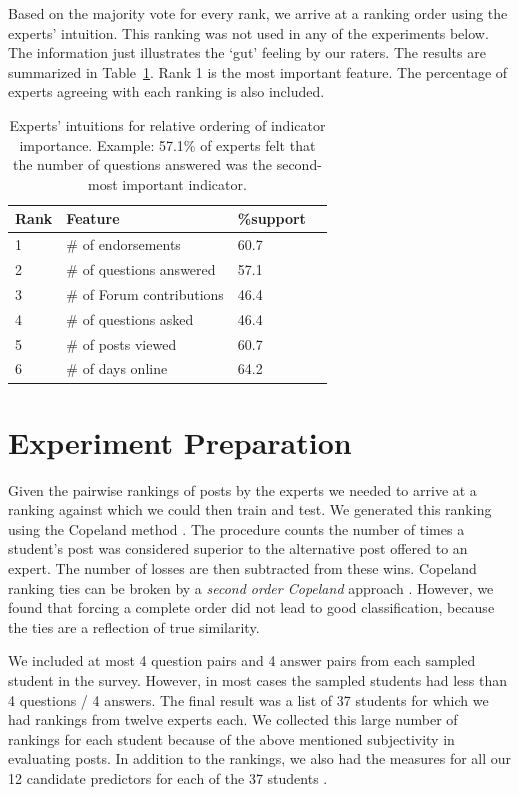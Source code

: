 Based on the majority vote for every rank, we arrive at a ranking
order using the experts' intuition. This ranking was not used in any
of the experiments below. The information just illustrates the `gut'
feeling by our raters. The results are summarized in
Table~\ref{tab:faqRes}. Rank 1 is the most important feature. The
percentage of experts agreeing with each ranking is also included.

\begin{table}
\centering
\caption{Experts' intuitions for relative ordering of indicator
  importance. Example: 57.1\% of experts felt that the number of
  questions answered was the second-most important indicator.}
\label{tab:faqRes}
\begin{tabular}{lllc}
\hline
\centering \textbf{Rank} & \textbf{Feature} & \textbf{ \%support}  & \\ \hline
1 & \# of endorsements & 60.7   \\
2 & \# of questions answered & 57.1\\
3 & \# of Forum contributions & 46.4\\
4 & \# of questions asked & 46.4 \\
5 & \# of posts viewed & 60.7 \\
6 & \# of days online & 64.2    \\ \hline
\end{tabular}
\end{table}


\section{Experiment Preparation}
Given the pairwise rankings of posts by the experts we needed to
arrive at a ranking against which we could then train and test. We
generated this ranking using the Copeland method \cite{cope51}. The
procedure counts the number of times a student's post was considered
superior to the alternative post offered to an expert. The number of
losses are then subtracted from these wins. Copeland ranking ties can be broken by a \emph{second order Copeland} approach \cite{ties}. However, we found that forcing a complete order did not lead to good classification, because the ties are a reflection of true similarity.

We included at most 4 question pairs and 4 answer pairs from each sampled student in the survey. However, in most cases the sampled students had less than 4 questions / 4 answers. The final result was a list of 37 students for which we had
rankings from twelve experts each. We collected this large number of
rankings for each student because of the above mentioned subjectivity
in evaluating posts. In addition to the rankings, we also had the
measures for all our 12 candidate predictors for each of the 37
students .

